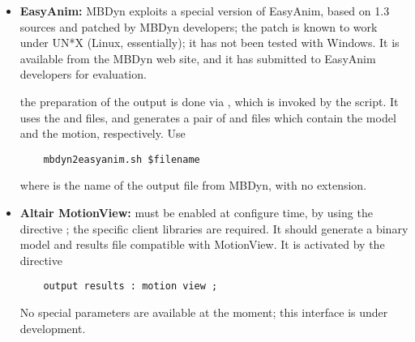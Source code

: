 \begin{itemize}
\item \textbf{EasyAnim:}
MBDyn exploits a special version of EasyAnim, based on 1.3 sources
and patched by MBDyn developers; the patch is known to work under UN*X
(Linux, essentially); it has not been tested with Windows.
It is available from the MBDyn web site, and it has submitted to EasyAnim
developers for evaluation.

the preparation of the output is done via , which is invoked
by the  script.
It uses the  and  files, and generates a pair of
 and  files which contain the model and the motion,
respectively.
Use
\begin{verbatim}
    mbdyn2easyanim.sh $filename
\end{verbatim}
where  is the name of the output file from MBDyn,
with no extension.

\item \textbf{Altair MotionView:}
must be enabled at configure time, by using the directive
; the specific client libraries 
are required.
It should generate a binary model and results file compatible
with MotionView.
It is activated by the directive
\begin{verbatim}
    output results : motion view ;
\end{verbatim}
No special parameters are available at the moment; 
this interface is under development.

\end{itemize}
